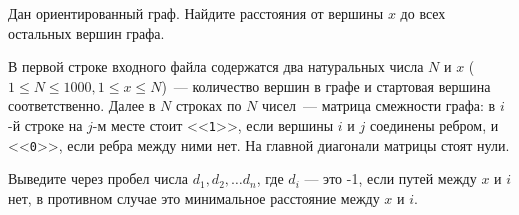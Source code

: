 Дан ориентированный граф. Найдите расстояния от вершины $x$ до всех остальных вершин графа.

\InputFile
В первой строке входного файла содержатся два натуральных числа $N$ и $x$ ($1 \leq N \leq 1000, 1 \leq x \leq N$)~--- количество вершин в графе и стартовая вершина соответственно. Далее в $N$ строках по $N$ чисел~--- матрица смежности графа: в $i$-й строке на $j$-м месте стоит <<\texttt{1}>>, если вершины $i$ и $j$ соединены ребром, и <<\texttt{0}>>, если ребра между ними нет. На главной диагонали матрицы стоят нули. 

\OutputFile
Выведите через пробел числа $d_1, d_2, \dots d_n$, где $d_i$ --- это -1, если путей между $x$ и $i$ нет, в противном случае это минимальное расстояние между $x$ и $i$.


